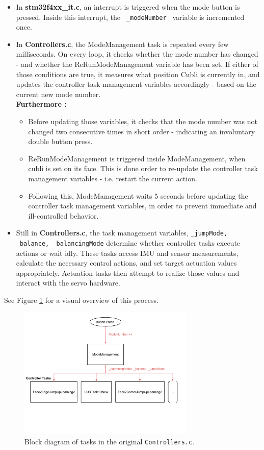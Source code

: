 \begin{itemize}
\item In \textbf{stm32f4xx\_it.c}, an interrupt is triggered when the mode button is pressed. Inside this interrupt, the \texttt{ \_modeNumber } variable is incremented once.

\item In \textbf{Controllers.c}, the ModeManagement task is repeated every few milliseconds. On every loop, it checks whether the mode number has changed - and whether the ReRunModeManagement variable has been set. If either of those conditions are true, it measures what position Cubli is currently in, and updates the controller task management variables accordingly - based on the current new mode number.\\

\textbf{Furthermore :} 
\begin{itemize}
\item[] Before updating those variables, it checks that the mode number was not changed two consecutive times in short order - indicating an involuntary double button press.
\item[] ReRunModeManagement is triggered inside ModeManagement, when cubli is set on its face. This is done order to re-update the controller task management variables - i.e. restart the current action. 
\item[] Following this, ModeManagement waits 5 seconds before updating the controller task management variables, in order to prevent immediate and ill-controlled behavior.
\end{itemize}

\item Still in \textbf{Controllers.c}, the task management variables, \texttt{\_jumpMode, \_balance, \_balancingMode} determine whether controller tasks execute actions or wait idly. These tasks access IMU and sensor measurements, calculate the necessary control actions, and set target actuation values appropriately. Actuation tasks then attempt to realize those values and interact with the servo hardware.
\end{itemize}

See Figure \ref{img:Controllers} for a visual overview of this process.

\begin{figure}[ht]
   \centering
   \includegraphics[width=0.75\textwidth]{img/Controllers.png}
   \caption{Block diagram of tasks in the original \texttt{Controllers.c}.}
   \label{img:Controllers}
\end{figure}


